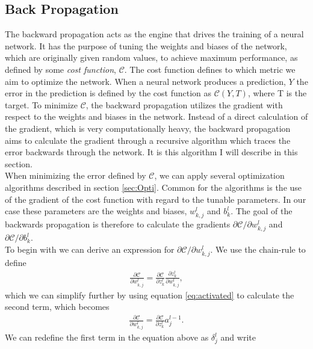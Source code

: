 \subsection{Back Propagation}\label{subsec:BP}
The backward propagation acts as the engine that drives the training of a neural network. It has the purpose
of tuning the weights and biases of the network, which are originally given random values, to achieve maximum performance,
 as defined by some \emph{cost function}, $\mathcal{C}$. The cost function defines to which metric we aim to optimize the network. 
When a neural network produces a prediction, $Y$ the error in the prediction
is defined by the cost function as $\mathcal{C}\left(Y, T\right)$, where T is the target. To minimize $\mathcal{C}$, the 
backward propagation utilizes the gradient with respect to the weights and biases in the network. Instead of a
direct calculation of the gradient, which is very computationally heavy, the backward propagation 
aims to calculate the gradient through a recursive algorithm which traces the error backwards through the network. It is 
this algorithm I will describe in this section.
\\
\newline
When minimizing the error defined by $\mathcal{C}$, we can apply several optimization algorithms described in 
section \ref{sec:Opti}. Common for the algorithms is the use of the gradient of the cost function with regard to 
the tunable parameters. In our case these parameters are the weights and biases, $w_{k,j}^l$ and $b^l_k$. The goal of 
the backwards propagation is therefore to calculate the gradients $\partial \mathcal{C}/\partial w_{k,j}^l$ and
$\partial \mathcal{C}/\partial b^l_k$. 
\\
\newline
To begin with we can derive an expression for $\partial \mathcal{C}/\partial w_{k,j}^l$. We use the chain-rule to define 
\begin{align*}
    \frac{\partial \mathcal{C}}{\partial w_{k,j}^l} = \frac{\partial \mathcal{C}}{\partial z^l_k} \frac{\partial z^l_k}{\partial w_{k,j}^l},
\end{align*}
which we can simplify further by using equation \ref{eq:activated} to calculate the second term, which becomes
\begin{align*}
    \frac{\partial \mathcal{C}}{\partial w_{k,j}^l} = \frac{\partial \mathcal{C}}{\partial z^l_k} a^{l-1}_j.
\end{align*}
We can redefine the first term in the equation above as $\delta_j^l$ and write
